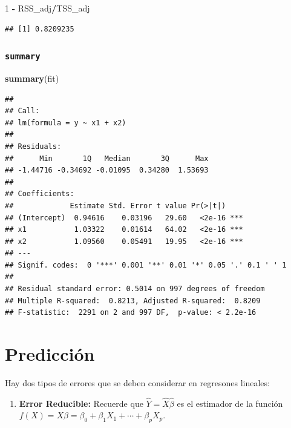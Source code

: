 \documentclass[
  12pt,
]{book}
\newenvironment{Shaded}{\begin{snugshade}}{\end{snugshade}}
\newcommand{\DecValTok}[1]{\textcolor[rgb]{0.00,0.00,0.81}{#1}}
\newcommand{\KeywordTok}[1]{\textcolor[rgb]{0.13,0.29,0.53}{\textbf{#1}}}
\newcommand{\NormalTok}[1]{#1}
\newcommand{\OperatorTok}[1]{\textcolor[rgb]{0.81,0.36,0.00}{\textbf{#1}}}
\newcommand{\StringTok}[1]{\textcolor[rgb]{0.31,0.60,0.02}{#1}}
\providecommand{\tightlist}{%
  \setlength{\itemsep}{0pt}\setlength{\parskip}{0pt}}
\theoremstyle{definition}
\theoremstyle{definition}
\theoremstyle{definition}
\theoremstyle{remark}
\begin{document}
\begin{Shaded}
\begin{Highlighting}[]
\DecValTok{1} \OperatorTok{-}\StringTok{ }\NormalTok{RSS_adj}\OperatorTok{/}\NormalTok{TSS_adj}
\end{Highlighting}
\end{Shaded}

\begin{verbatim}
## [1] 0.8209235
\end{verbatim}

\hypertarget{summary}{%
\subsubsection{\texorpdfstring{\texttt{summary}}{summary}}\label{summary}}

\begin{Shaded}
\begin{Highlighting}[]
\KeywordTok{summary}\NormalTok{(fit)}
\end{Highlighting}
\end{Shaded}

\begin{verbatim}
## 
## Call:
## lm(formula = y ~ x1 + x2)
## 
## Residuals:
##      Min       1Q   Median       3Q      Max 
## -1.44716 -0.34692 -0.01095  0.34280  1.53693 
## 
## Coefficients:
##             Estimate Std. Error t value Pr(>|t|)    
## (Intercept)  0.94616    0.03196   29.60   <2e-16 ***
## x1           1.03322    0.01614   64.02   <2e-16 ***
## x2           1.09560    0.05491   19.95   <2e-16 ***
## ---
## Signif. codes:  0 '***' 0.001 '**' 0.01 '*' 0.05 '.' 0.1 ' ' 1
## 
## Residual standard error: 0.5014 on 997 degrees of freedom
## Multiple R-squared:  0.8213, Adjusted R-squared:  0.8209 
## F-statistic:  2291 on 2 and 997 DF,  p-value: < 2.2e-16
\end{verbatim}

\hypertarget{predicciuxf3n}{%
\section{Predicción}\label{predicciuxf3n}}

Hay dos tipos de errores que se deben considerar en regresones lineales:

\begin{enumerate}
\def\labelenumi{\arabic{enumi}.}
\tightlist
\item
  \textbf{Error Reducible:} Recuerde que \(\hat{Y} = \hat{X}\hat{\beta}\) es el estimador de la función \(f(X)=X\beta = \beta_{0} + \beta_{1}X_{1}+\cdots+\beta_{p}X_{p}\).
\end{enumerate}
\end{document}
